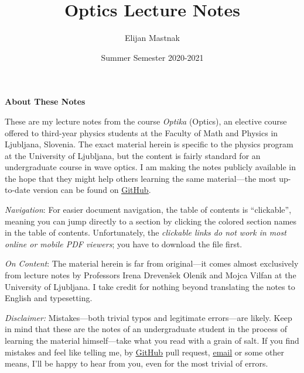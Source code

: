 \documentclass[11pt, a4paper]{article}
\begin{document}
\title{Optics Lecture Notes}
\author{Elijan Mastnak}
\date{Summer Semester 2020-2021}
\maketitle

\thispagestyle{empty}  %

\begin{center}
\textbf{About These Notes}
\end{center}
These are my lecture notes from the course \textit{Optika} (Optics), an elective course offered to third-year physics students at the Faculty of Math and Physics in Ljubljana, Slovenia. The exact material herein is specific to the physics program at the University of Ljubljana, but the content is fairly standard for an undergraduate course in wave optics. I am making the notes publicly available in the hope that they might help others learning the same material---the most up-to-date version can be found on \href{https://github.com/ejmastnak/fmf/tree/main/quantum-mechanics/qm-vaje}{\underline{GitHub}}.

\vspace{2mm}
\textit{Navigation}: For easier document navigation, the table of contents is ``clickable'', meaning you can jump directly to a section by clicking the colored section names in the table of contents. Unfortunately, the \textit{clickable links do not work in most online or mobile PDF viewers}; you have to download the file first.

\vspace{2mm}
\textit{On Content}: The material herein is far from original---it comes almost exclusively from lecture notes by Professors Irena Dreven\v{s}ek Olenik and Mojca Vilfan at the University of Ljubljana. I take credit for nothing beyond translating the notes to English and typesetting.

\vspace{2mm}
\textit{Disclaimer:} Mistakes---both trivial typos and legitimate errors---are likely. Keep in mind that these are the notes of an undergraduate student in the process of learning the material himself---take what you read with a grain of salt. If you find mistakes and feel like telling me, by \href{https://github.com/ejmastnak/fmf}{\underline{GitHub}} pull request, \href{mailto:ejmastnak@gmail.com}{\underline{email}} or some other means, I'll be happy to hear from you, even for the most trivial of errors.

\newpage
\end{document}
